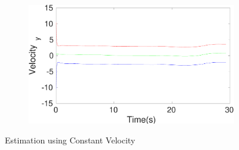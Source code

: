 \begin{figure}[h]
\begin{subfigure}{.5\linewidth}
\end{subfigure}
\begin{subfigure}{.5\linewidth}
\centering
\includegraphics[width=\linewidth]{figures/Frad/s3cvSMVelocity_y}
\end{subfigure}
\caption{Estimation using Constant Velocity}
\end{figure}

